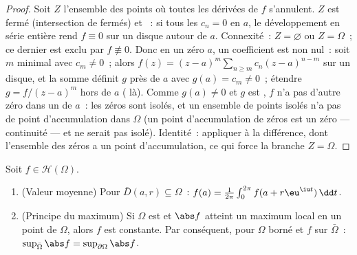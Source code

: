 \begin{proof}
Soit $Z$ l'ensemble des points où toutes les dérivées de $f$
s'annulent. $Z$ est fermé (intersection de fermés) et ~:
si tous les $c_n = 0$ en $a$, le développement en série entière
rend $f \equiv 0$ sur un disque autour de $a$. Connexité~: $Z =
\varnothing$ ou $Z = \Omega$~; ce dernier est exclu par $f
\not\equiv 0$. Donc en un zéro $a$, un coefficient est non nul~:
soit $m$ minimal avec $c_m \neq 0$~; alors $f(z) = (z -
a)^m\sum_{n\geq m}c_n(z-a)^{n-m}$ sur un disque, et la somme
définit $g$  près de $a$ avec $g(a) = c_m \neq 0$~;
étendre $g = f/(z-a)^m$ hors de $a$ ( là). Comme
$g(a) \neq 0$ et $g$ est , $f$ n'a pas d'autre zéro
dans un  de $a$~: les zéros sont isolés, et un ensemble
de points isolés n'a pas de point d'accumulation dans $\Omega$
(un point d'accumulation de zéros est un zéro --- continuité ---
et ne serait pas isolé). Identité~: appliquer à la différence,
dont l'ensemble des zéros a un point d'accumulation, ce qui
force la branche $Z = \Omega$.
\end{proof}

\begin{theorem}
\label{thm:b3:holomorphic:maximum}
Soit $f \in \mathcal H(\Omega)$.
\begin{enumerate}
  \item (Valeur moyenne) Pour $\bar D(a, r) \subseteq \Omega$~:
        $f(a) = \frac1{2\pi}\int_0^{2\pi}f(a +
        r\eu^{\iu t})\,\dd t$.
  \item (Principe du maximum) Si $\Omega$ est  et
        $\abs f$ atteint un maximum local en un point de
        $\Omega$, alors $f$ est constante. Par conséquent,
        pour $\Omega$ borné et $f$  sur
        $\bar\Omega$~: $\sup_{\bar\Omega}\abs f =
        \sup_{\partial\Omega}\abs f$.
\end{enumerate}
\end{theorem}

